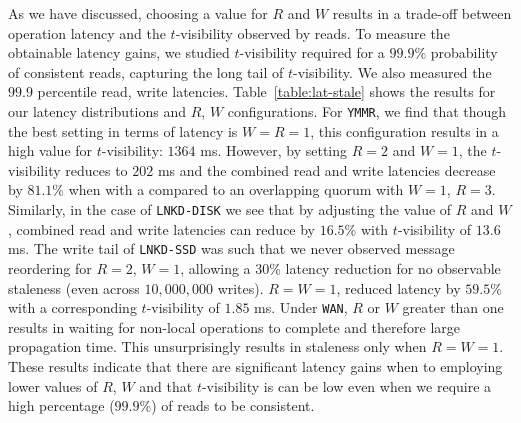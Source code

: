 \documentclass{vldb}
\begin{document}
As we have discussed, choosing a value for $R$ and $W$ results in a
trade-off between operation latency and the $t$-visibility observed by
reads. To measure the obtainable latency gains, we studied
$t$-visibility required for a $99.9\%$ probability of consistent
reads, capturing the long tail of $t$-visibility.  We also measured
the $99.9$ percentile read, write latencies.
Table~\ref{table:lat-stale} shows the results for our latency
distributions and $R$, $W$ configurations.  For \texttt{YMMR}, we find
that though the best setting in terms of latency is $W$$=$$R$$=$$1$,
this configuration results in a high value for $t$-visibility: $1364$
ms. However, by setting $R$$=$$2$ and $W$$=$$1$, the $t$-visibility
reduces to $202$ ms and the combined read and write latencies decrease
by $81.1\%$ when with a compared to an overlapping quorum with
$W$$=$$1$, $R$$=$$3$.  Similarly, in the case of \texttt{LNKD-DISK} we
see that by adjusting the value of $R$ and $W$, combined read and
write latencies can reduce by $16.5\%$ with $t$-visibility of $13.6$
ms.  The write tail of \texttt{LNKD-SSD} was such that we never
observed message reordering for $R$$=$$2$, $W$$=$$1$, allowing a 30\%
latency reduction for no observable staleness (even across
$10,000,000$ writes).  $R$$=$$W$$=$$1$, reduced latency by $59.5\%$
with a corresponding $t$-visibility of $1.85$ ms.  Under \texttt{WAN},
$R$ or $W$ greater than one results in waiting for non-local
operations to complete and therefore large propagation time.  This
unsurprisingly results in staleness only when $R$$=$$W$$=$$1$.  These
results indicate that there are significant latency gains when to
employing lower values of $R$, $W$ and that $t$-visibility is can be
low even when we require a high percentage ($99.9\%$) of reads to be
consistent.
\end{document}
